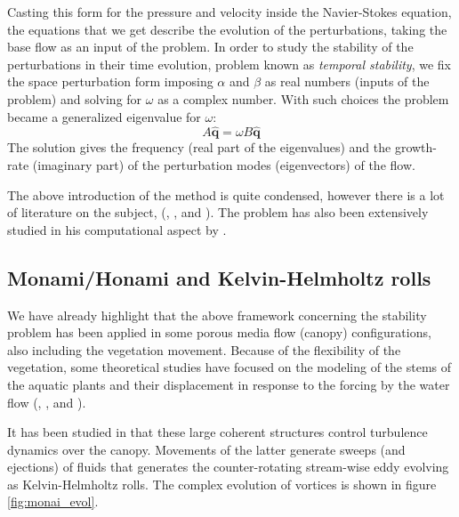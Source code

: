 Casting this form for the pressure and velocity inside the Navier-Stokes equation, the equations that we get describe the evolution of the perturbations, taking the base flow as an input of the problem.
In order to study the stability of the perturbations in their time evolution, problem known as \textit{temporal stability}, we fix the space perturbation form imposing $\alpha$ and $\beta$ as real numbers (inputs of the problem) and solving for $\omega$ as a complex number.
With such choices the problem became a generalized eigenvalue for $\omega$:
$$ A \widehat{\mathbf{q}} =  \omega B\widehat{\mathbf{q}} $$
The solution gives the frequency (real part of the eigenvalues) and the growth-rate (imaginary part) of the perturbation modes (eigenvectors) of the flow.

The above introduction of the method is quite condensed, however there is a lot of literature on the subject, (\citet{juniper2014modal}, \citet{criminale2003theory}, \citet{schmid2012stability} and \citet{ortiz2002spatial}). The problem has also been extensively studied in his computational aspect by \citet{canuto1988spectral}.

\subsection{Monami/Honami and Kelvin-Helmholtz rolls}

We have already highlight that the above framework concerning the stability problem has been applied in some porous media flow (canopy) configurations, also including the vegetation movement.
Because of the flexibility of the vegetation, some theoretical studies have focused on the
modeling of the stems of the aquatic plants and their displacement in response to the forcing by the
water flow (\citet{py2004mixing}, \citet{patil2010characteristics}, \citet{gosselin2009destabilising} and \citet{py2006frequency}).

It has been studied in \citet{finnigan2000turbulence} that these large coherent structures control turbulence dynamics over the canopy. 
Movements of the latter generate sweeps (and ejections) of fluids that generates the counter-rotating stream-wise eddy evolving as Kelvin-Helmholtz rolls.
The complex evolution of vortices is shown in figure \ref{fig:monai_evol}.

